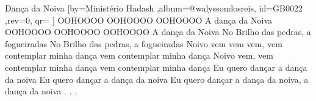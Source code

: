 \beginsong
{Dança da Noiva %
}[by={Ministério Hadash %
},album={@walyssondosreis},
id={GB0022 %
},rev={0}, %
qr={ %
}]
\beginverse*
OOHOOOO OOHOOOO OOHOOOO A dança da Noiva
OOHOOOO OOHOOOO OOHOOOO A dança da Noiva
\endverse
\beginverse*
No Brilho das pedras, a fogueiradas
No Brilho das pedras, a fogueiradas
\endverse
\beginverse*
Noivo vem vem vem, vem contemplar minha dança
vem contemplar minha dança
Noivo vem, vem contemplar minha dança
vem contemplar minha dança
\endverse
\beginchorus
Eu quero dançar a dança da noiva
Eu quero dançar a dança da noiva
Eu quero dançar a dança da noiva, a dança da noiva
\endchorus
\beginverse*
.
.
.
\endverse

